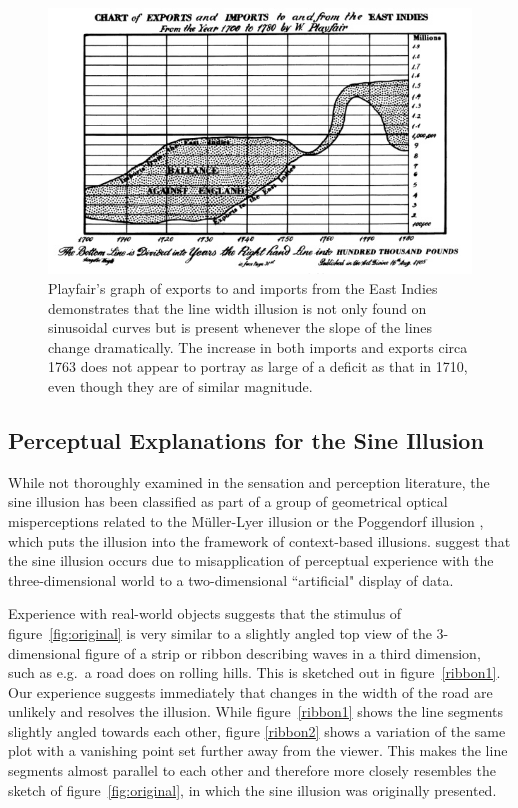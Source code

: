 \documentclass[11pt]{isuthesis}\usepackage[]{graphicx}\usepackage[]{color}
\begin{document}
\begin{figure}[h!tbp]
\centering
\includegraphics[keepaspectratio=TRUE,width=.7\linewidth]{PlayfairExportImports}
\caption[Imports to and exports from the East Indies in the 1700s]{Playfair's graph of exports to and imports from the East Indies demonstrates that the line width illusion is not only found on sinusoidal curves but is present whenever the slope of the lines change dramatically. The increase in both imports and exports circa 1763 does not appear to portray as large of a deficit as that in 1710, even though they are of similar magnitude.}
\label{fig:playfair-debt}
\end{figure}

\subsection{Perceptual Explanations for the Sine Illusion}\label{perceptualexplanations}\hfill\newline
While not thoroughly examined in the sensation and perception literature, the sine illusion has been classified as part of a group of geometrical optical misperceptions  related to the M\"uller-Lyer illusion \citep{day:1991} or the Poggendorf illusion \citep{poggendorf}, which puts the illusion into the framework of context-based illusions. \citet{day:1991} suggest that the sine illusion occurs due to misapplication of perceptual experience with the three-dimensional world to a two-dimensional ``artificial" display of data.  

Experience with real-world objects suggests that the stimulus of figure~\ref{fig:original} is very similar to a slightly angled top view of the 3-dimensional figure of a strip or ribbon describing waves in a third dimension, such as e.g.~a road does on rolling hills. This is sketched out in figure~\ref{ribbon1}. Our experience suggests immediately that changes in the width of the road are unlikely and resolves the illusion. While figure~\ref{ribbon1} shows the line segments slightly angled towards each other, figure \ref{ribbon2} shows a variation of the same plot with a  vanishing point set further away from the viewer. This makes the line segments almost parallel to each other and therefore more closely resembles the sketch of figure~\ref{fig:original}, in which the sine illusion was originally presented.
\end{document}
